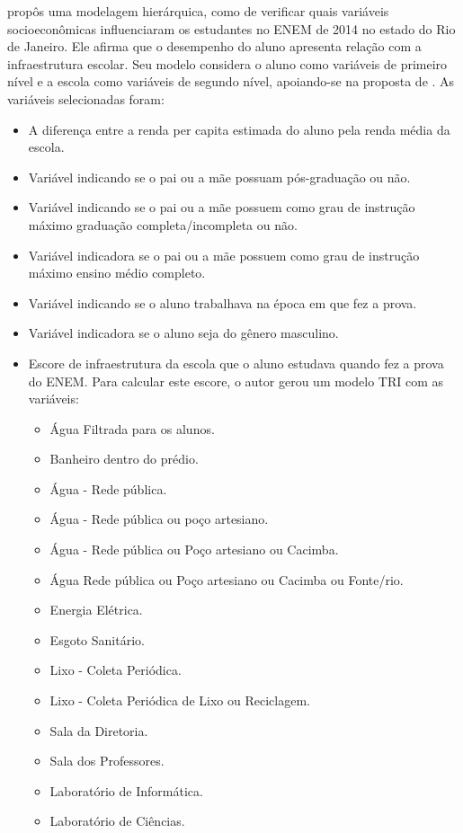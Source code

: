  propôs uma modelagem hierárquica, como de verificar quais variáveis socioeconômicas influenciaram os estudantes no ENEM de 2014 no estado do Rio de Janeiro. Ele afirma que o desempenho do aluno apresenta relação com a infraestrutura escolar. Seu modelo considera o aluno como variáveis de primeiro nível e a escola como variáveis de segundo nível, apoiando-se na proposta de .
As variáveis selecionadas foram:
\begin{itemize}
\item A diferença entre a renda per capita estimada do aluno pela renda média da escola.
\item Variável indicando se o pai ou a mãe possuam pós-graduação ou não.
\item Variável indicando se o pai ou a mãe possuem como grau de instrução máximo graduação completa/incompleta ou não.
\item Variável indicadora se o pai ou a mãe possuem como grau de instrução máximo ensino médio completo.
\item Variável indicando se o aluno trabalhava na época em que fez a prova.
\item Variável indicadora se o aluno seja do gênero masculino.
\item Escore de infraestrutura da escola que o aluno estudava quando fez a prova do ENEM. Para calcular este escore, o autor gerou um modelo TRI com as variáveis:
\begin{itemize}
\item Água Filtrada para os alunos.
\item Banheiro dentro do prédio.
\item Água - Rede pública.
\item Água - Rede pública ou poço artesiano.
\item Água - Rede pública ou Poço artesiano ou Cacimba.
\item Água Rede pública ou Poço artesiano ou Cacimba ou Fonte/rio.
\item Energia Elétrica.
\item Esgoto Sanitário.
\item Lixo - Coleta Periódica.
\item Lixo - Coleta Periódica de Lixo ou Reciclagem.
\item Sala da Diretoria.
\item Sala dos Professores.
\item Laboratório de Informática.
\item Laboratório de Ciências.

\end{itemize}
\end{itemize}
